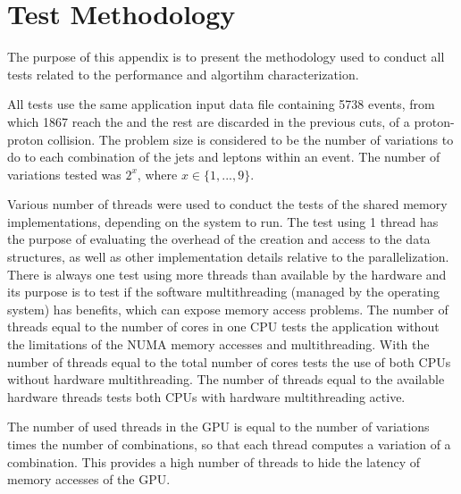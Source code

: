 \chapter{Test Methodology}
\label{App:TestMethodology}

The purpose of this appendix is to present the methodology used to conduct all tests related to the performance and algortihm characterization.

All tests use the same application input data file containing 5738 events, from which 1867 reach the \ttDilepKinFit and the rest are discarded in the previous cuts, of a proton-proton collision. The problem size is considered to be the number of variations to do to each combination of the jets and leptons within an event. The number of variations tested was $2^{x}$, where $x \in \{1, ..., 9\}$.

Various number of threads were used to conduct the tests of the shared memory implementations, depending on the system to run. The test using 1 thread has the purpose of evaluating the overhead of the creation and access to the data structures, as well as other implementation details relative to the parallelization. There is always one test using more threads than available by the hardware and its purpose is to test if the software multithreading (managed by the operating system) has benefits, which can expose memory access problems. The number of threads equal to the number of cores in one CPU tests the application without the limitations of the NUMA memory accesses and multithreading. With the number of threads equal to the total number of cores tests the use of both CPUs without hardware multithreading. The number of threads equal to the available hardware threads tests both CPUs with hardware multithreading active.

The number of used threads in the GPU is equal to the number of variations times the number of combinations, so that each thread computes a variation of a combination. This provides a high number of threads to hide the latency of memory accesses of the GPU.


